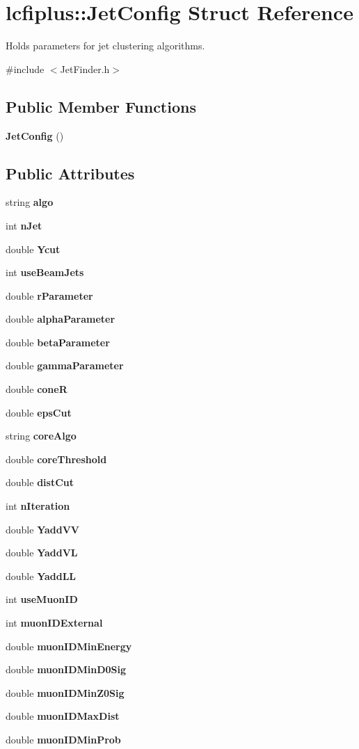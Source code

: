 \section{lcfiplus\-:\-:Jet\-Config Struct Reference}
\label{structlcfiplus_1_1JetConfig}


Holds parameters for jet clustering algorithms.  




{\ttfamily \#include $<$Jet\-Finder.\-h$>$}

\subsection*{Public Member Functions}
\begin{DoxyCompactItemize}
\item 
{\bf Jet\-Config} ()
\end{DoxyCompactItemize}
\subsection*{Public Attributes}
\begin{DoxyCompactItemize}
\item 
string {\bf algo}
\item 
int {\bf n\-Jet}
\item 
double {\bf Ycut}
\item 
int {\bf use\-Beam\-Jets}
\item 
double {\bf r\-Parameter}
\item 
double {\bf alpha\-Parameter}
\item 
double {\bf beta\-Parameter}
\item 
double {\bf gamma\-Parameter}
\item 
double {\bf cone\-R}
\item 
double {\bf eps\-Cut}
\item 
string {\bf core\-Algo}
\item 
double {\bf core\-Threshold}
\item 
double {\bf dist\-Cut}
\item 
int {\bf n\-Iteration}
\item 
double {\bf Yadd\-V\-V}
\item 
double {\bf Yadd\-V\-L}
\item 
double {\bf Yadd\-L\-L}
\item 
int {\bf use\-Muon\-I\-D}
\item 
int {\bf muon\-I\-D\-External}
\item 
double {\bf muon\-I\-D\-Min\-Energy}
\item 
double {\bf muon\-I\-D\-Min\-D0\-Sig}
\item 
double {\bf muon\-I\-D\-Min\-Z0\-Sig}
\item 
double {\bf muon\-I\-D\-Max\-Dist}
\item 
double {\bf muon\-I\-D\-Min\-Prob}
\end{DoxyCompactItemize}


